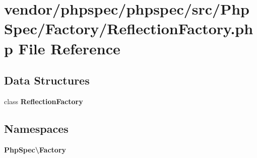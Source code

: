 \section{vendor/phpspec/phpspec/src/\+Php\+Spec/\+Factory/\+Reflection\+Factory.php File Reference}
\label{_reflection_factory_8php}
\subsection*{Data Structures}
\begin{DoxyCompactItemize}
\item 
class {\bf Reflection\+Factory}
\end{DoxyCompactItemize}
\subsection*{Namespaces}
\begin{DoxyCompactItemize}
\item 
 {\bf Php\+Spec\textbackslash{}\+Factory}
\end{DoxyCompactItemize}
